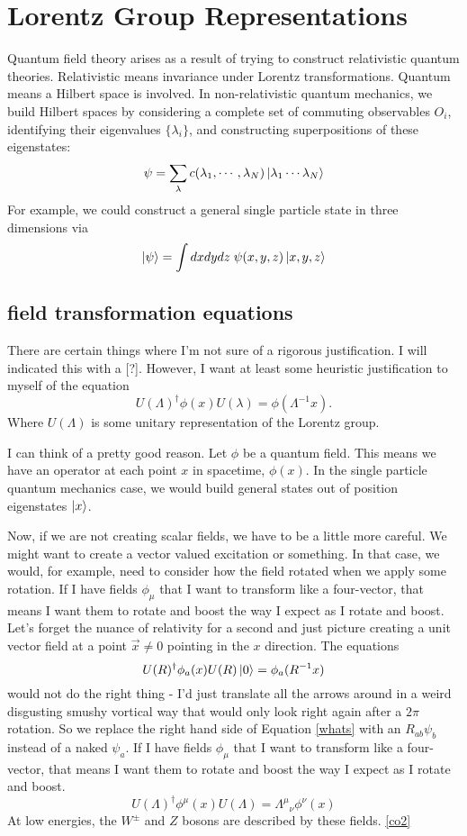 \documentclass[main.tex]{subfiles}
\begin{document}
\chapter{Lorentz Group Representations}

Quantum field theory arises as a result of trying to construct relativistic quantum theories. Relativistic means invariance under Lorentz transformations. Quantum means a Hilbert space is involved. In non-relativistic quantum mechanics, we build Hilbert spaces by considering a complete set of commuting observables $O_i$, identifying their eigenvalues $\{\lambda_i\}$, and constructing superpositions of these eigenstates:
\[
\psi =  \sum_{\lambda} c(\lambda_1,\cdots,\lambda_N) \ket{\lambda_1 \cdots \lambda_N}
\]
For example, we could construct a general single particle state in three dimensions via
\[
\ket{\psi} = \int dx dy dz \; \psi(x,y,z) \ket{x,y,z}
\]

\section{field transformation equations}
There are certain things where I'm not sure of a rigorous justification. I will indicated this with a [?]. However, I want at least some heuristic justification to myself of the equation
\begin{equation} \label{desiderata} 
U(\Lambda)^{\dagger} \phi(x) U(\lambda) = \phi(\Lambda^{-1} x).
\end{equation}
Where $U(\Lambda)$ is some unitary representation of the Lorentz group.

I can think of a pretty good reason. Let $\phi$ be a quantum field. This means we have an operator at each point $x$ in spacetime, $\phi(x)$. In the single particle quantum mechanics case, we would build general states out of position eigenstates $\ket{x}$. 


Now, if we are not creating scalar fields, we have to be a little more careful. We might want to create a vector valued excitation or something. In that case, we would, for example, need to consider how the field rotated when we apply some rotation. If I have fields $\phi_\mu$ that I want to transform like a four-vector, that means I want them to rotate and boost the way I expect as I rotate and boost. Let's forget the nuance of relativity for a second and just picture creating a unit vector field at a point $\vec{x} \neq 0$ pointing in the $x$ direction. The equations
\begin{equation} \label{whats}
U(R)^\dagger \phi_a (x) U(R) \ket{0} = \phi_a (R^{-1} x) 
\end{equation}
would not do the right thing - I'd just translate all the arrows around in a weird disgusting smushy vortical way that would only look right again after a $2\pi$ rotation. So we replace the right hand side of Equation \ref{whats} with an $R_{ab} \psi_b$ instead of a naked $\psi_a$. If I have fields $\phi_\mu$ that I want to transform like a four-vector, that means I want them to rotate and boost the way I expect as I rotate and boost.
\[
U(\Lambda)^\dagger \phi^\mu (x) U(\Lambda) = {\Lambda^\mu}_\nu \phi^\nu (x)
\]
At low energies, the $W^\pm$ and $Z$ bosons are described by these fields. \ref{co2}
\end{document}
